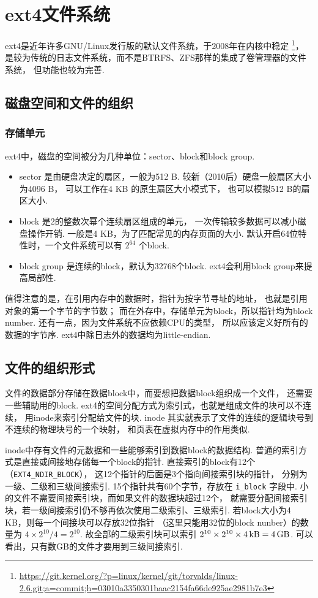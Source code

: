 \section{ext4文件系统}
ext4是近年许多GNU/Linux发行版的默认文件系统，于2008年在内核中稳定
\footnote{\url{https://git.kernel.org/?p=linux/kernel/git/torvalds/linux-2.6.git;a=commit;h=03010a3350301baac2154fa66de925ae2981b7e3}}，
是较为传统的日志文件系统，而不是BTRFS、ZFS那样的集成了卷管理器的文件系统，
但功能也较为完善.

\subsection{磁盘空间和文件的组织}
\subsubsection{存储单元}
ext4中，磁盘的空间被分为几种单位：sector、block和block group.
\begin{itemize}
	\item sector 是由硬盘决定的扇区，一般为512 B.
	      较新（2010后）硬盘一般扇区大小为4096 B，
	      可以工作在4 KB 的原生扇区大小模式下，
	      也可以模拟512 B的扇区大小.
	\item block 是2的整数次幂个连续扇区组成的单元，
	      一次传输较多数据可以减小磁盘操作开销.
	      一般是4 KB，为了匹配常见的内存页面的大小.
	      默认开启64位特性时，一个文件系统可以有 $2^{64}$ 个block.
	\item block group 是连续的block，默认为32768个block. 
	      ext4会利用block group来提高局部性.
\end{itemize}
值得注意的是，在引用内存中的数据时，指针为按字节寻址的地址，
也就是引用对象的第一个字节的字节数；
而在外存中，存储单元为block，所以指针均为block number.
还有一点，因为文件系统不应依赖CPU的类型，
所以应该定义好所有的数据的字节序.
ext4中除日志外的数据均为little-endian.

\subsection{文件的组织形式}
文件的数据部分存储在数据block中，而要想把数据block组织成一个文件，
还需要一些辅助用的block.
ext4的空间分配方式为索引式，也就是组成文件的块可以不连续，
用inode来索引分配给文件的块.
inode 其实就表示了文件的连续的逻辑块号到不连续的物理块号的一个映射，
和页表在虚拟内存中的作用类似.

inode中存有文件的元数据和一些能够索引到数据block的数据结构.
普通的索引方式是直接或间接地存储每一个block的指针.
直接索引的block有12个（\lstinline{EXT4_NDIR_BLOCK}），
这12个指针的后面是3个指向间接索引块的指针，
分别为一级、二级和三级间接索引.
15个指针共有60个字节，存放在 \lstinline{i_block} 字段中.
小的文件不需要间接索引块，而如果文件的数据块超过12个，
就需要分配间接索引块，若一级间接索引仍不够再依次使用二级索引、三级索引.
若block大小为4 KB，则每一个间接块可以存放32位指针
（这里只能用32位的block nunber）的数量为 $4\times2^{10}/4 = 2^{10}$.
故全部的二级索引块可以索引 $2^{10}\times2^{10}\times\SI{4}{\kilo\byte} = \SI{4}{\giga\byte}$.
可以看出，只有数GB的文件才要用到三级间接索引.


